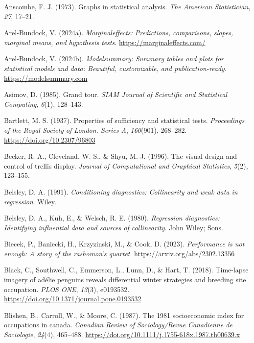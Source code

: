 \documentclass[
  letterpaper,
  10pt,
  krantz2]{krantz}
\newlength{\cslhangindent}
\newenvironment{CSLReferences}[2] %
 {\begin{list}{}{%
  \setlength{\itemindent}{0pt}
  \setlength{\leftmargin}{0pt}
  \setlength{\parsep}{0pt}
  \ifodd #1
   \setlength{\leftmargin}{\cslhangindent}
   \setlength{\itemindent}{-1\cslhangindent}
  \fi
  \setlength{\itemsep}{#2\baselineskip}}}
 {\end{list}}
\begin{document}
{\begin{CSLReferences}{1}{0}
Anscombe, F. J. (1973). Graphs in statistical analysis. \emph{The
American Statistician}, \emph{27}, 17--21.

Arel-Bundock, V. (2024a). \emph{Marginaleffects: Predictions,
comparisons, slopes, marginal means, and hypothesis tests}.
\url{https://marginaleffects.com/}

Arel-Bundock, V. (2024b). \emph{Modelsummary: Summary tables and plots
for statistical models and data: Beautiful, customizable, and
publication-ready}. \url{https://modelsummary.com}

Asimov, D. (1985). Grand tour. \emph{SIAM Journal of Scientific and
Statistical Computing}, \emph{6}(1), 128--143.

Bartlett, M. S. (1937). Properties of sufficiency and statistical tests.
\emph{Proceedings of the Royal Society of London. Series A},
\emph{160}(901), 268--282. \url{https://doi.org/10.2307/96803}

Becker, R. A., Cleveland, W. S., \& Shyu, M.-J. (1996). The visual
design and control of trellis display. \emph{Journal of Computational
and Graphical Statistics}, \emph{5}(2), 123--155.

Belsley, D. A. (1991). \emph{Conditioning diagnostics: Collinearity and
weak data in regression}. Wiley.

Belsley, D. A., Kuh, E., \& Welsch, R. E. (1980). \emph{Regression
diagnostics: Identifying influential data and sources of collinearity}.
John Wiley; Sons.

Biecek, P., Baniecki, H., Krzyzinski, M., \& Cook, D. (2023).
\emph{Performance is not enough: A story of the rashomon's quartet}.
\url{https://arxiv.org/abs/2302.13356}

Black, C., Southwell, C., Emmerson, L., Lunn, D., \& Hart, T. (2018).
Time-lapse imagery of adélie penguins reveals differential winter
strategies and breeding site occupation. \emph{PLOS ONE}, \emph{13}(3),
e0193532. \url{https://doi.org/10.1371/journal.pone.0193532}

Blishen, B., Carroll, W., \& Moore, C. (1987). The 1981 socioeconomic
index for occupations in canada. \emph{Canadian Review of
Sociology/Revue Canadienne de Sociologie}, \emph{24}(4), 465--488.
\url{https://doi.org/10.1111/j.1755-618x.1987.tb00639.x}


\end{CSLReferences}}
\end{document}
